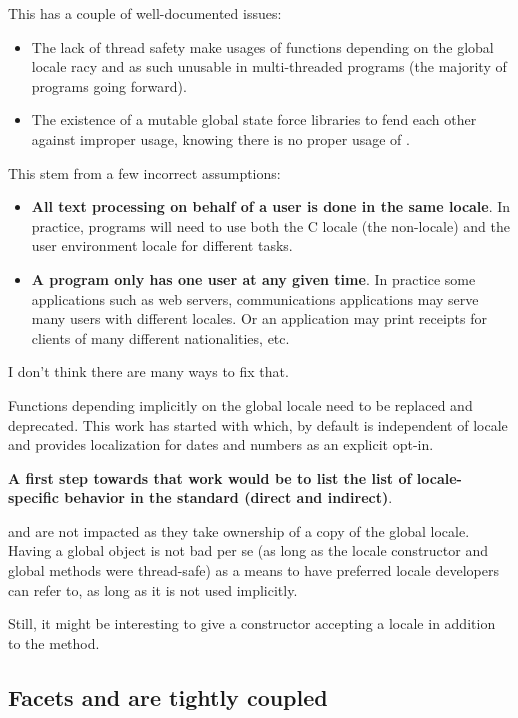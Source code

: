 \documentclass{wg21}
\begin{document}
This has a couple of well-documented issues:
\begin{itemize}
    \item The lack of thread safety make usages of functions depending on the global locale racy and as such unusable in multi-threaded programs (the majority of programs going forward).
    \item The existence of a mutable global state force libraries to fend each other against improper  usage, knowing there is no proper usage of .
\end{itemize}


This stem from a few incorrect assumptions:

\begin{itemize}
    \item \textbf{All text processing on behalf of a user is done in the same locale}. In practice, programs will need to use both the C locale (the non-locale) and the user environment locale for different tasks.
    \item \textbf{A program only has one user at any given time}. In practice some applications such as web servers, communications applications may serve many users with different locales. Or an application may print receipts for clients of many different nationalities, etc.
\end{itemize}



I don’t think there are many ways to fix that.

Functions depending implicitly on the global locale need to be replaced and deprecated.
This work has started with  which, by default is independent of locale and provides localization for dates and numbers as an explicit opt-in.

\textbf{A first step towards that work would be to list the list of locale-specific behavior in the standard (direct and indirect)}.

 and  are not impacted as they take ownership of a copy of the global locale.
Having a global object is not bad per se (as long as the locale constructor and global methods were thread-safe) as a means to have preferred locale developers can refer to, as long as it is not used implicitly.

Still, it might be interesting to give  a constructor accepting a locale in addition to the  method.

\subsection{Facets and  are tightly coupled}
\end{document}
